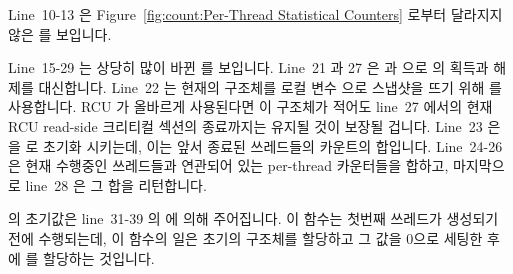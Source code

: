 Line~10-13 은
Figure~\ref{fig:count:Per-Thread Statistical Counters}
로부터 달라지지 않은  를 보입니다.
\iffalse

Lines~1-4 of
Figure~\ref{fig:together:RCU and Per-Thread Statistical Counters}
show the \co{countarray} structure, which contains a
\co{->total} field for the count from previously exited threads,
and a \co{counterp[]} array of pointers to the per-thread
\co{counter} for each currently running thread.
This structure allows a given execution of \co{read_count()}
to see a total that is consistent with the indicated set of running
threads.

Lines~6-8 contain the definition of the per-thread \co{counter}
variable, the global pointer \co{countarrayp} referencing
the current \co{countarray} structure, and
the \co{final_mutex} spinlock.

Lines~10-13 show \co{inc_count()}, which is unchanged from
Figure~\ref{fig:count:Per-Thread Statistical Counters}.
\fi

Line~15-29 는 상당히 많이 바뀐  를 보입니다.
Line~21 과 27 은  과  으로
 의 획득과 해제를 대신합니다.
Line~22 는 현재의  구조체를 로컬 변수  으로 스냅샷을
뜨기 위해  를 사용합니다.
RCU 가 올바르게 사용된다면 이  구조체가 적어도 line~27 에서의
현재 RCU read-side 크리티컬 섹션의 종료까지는 유지될 것이 보장될 겁니다.
Line~23 은  을  로 초기화 시키는데, 이는 앞서 종료된
쓰레드들의 카운트의 합입니다.
Line~24-26 은 현재 수행중인 쓰레드들과 연관되어 있는 per-thread 카운터들을
합하고, 마지막으로 line~28 은 그 합을 리턴합니다.
\iffalse

Lines~15-29 show \co{read_count()}, which has changed significantly.
Lines~21 and~27 substitute \co{rcu_read_lock()} and
\co{rcu_read_unlock()} for acquisition and release of \co{final_mutex}.
Line~22 uses \co{rcu_dereference()} to snapshot the
current \co{countarray} structure into local variable \co{cap}.
Proper use of RCU will guarantee that this \co{countarray} structure
will remain with us through at least the end of the current RCU
read-side critical section at line~27.
Line~23 initializes \co{sum} to \co{cap->total}, which is the
sum of the counts of threads that have previously exited.
Lines~24-26 add up the per-thread counters corresponding to currently
running threads, and, finally, line~28 returns the sum.
\fi

 의 초기값은 line~31-39 의  에 의해
주어집니다.
이 함수는 첫번째 쓰레드가 생성되기 전에 수행되는데, 이 함수의 일은 초기의
구조체를 할당하고 그 값을 0으로 세팅한 후에  를 할당하는
것입니다.

